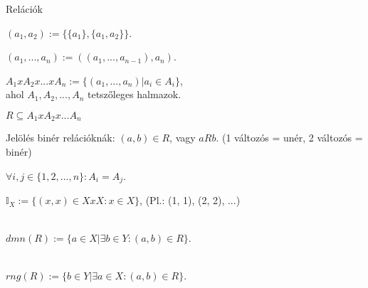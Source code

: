 \begin{frame}[plain]
\begin{tcolorbox}[center, colback={myyellow}, coltext={black}, colframe={myyellow}]
    {\RHuge Relációk}
    \mmedskip
\end{tcolorbox}
\end{frame}

\begin{frame}
  \begin{tcolorbox}[title={Def.: Rendezett pár}]
    $(a_1, a_2) := \{ \{ a_1 \}, \{ a_1, a_2 \} \}$.
  \end{tcolorbox}

  \begin{tcolorbox}[title={Def.: Rendezett $n$-es}]
    $(a_1, ..., a_n) := ((a_1, ..., a_{n - 1}), a_n)$.
  \end{tcolorbox}

  \begin{tcolorbox}[title={Def.: Descartes (Direkt) szorzat}]
    $A_1 x A_2 x ... x A_n := \{ (a_1, ..., a_n) | a_i \in A_i \}$,\\
    ahol $A_1, A_2, ..., A_n$ tetszőleges halmazok.
  \end{tcolorbox}

  \begin{tcolorbox}[title={Def.: $n$ változós reláció}]
    $R \subseteq A_1 x A_2 x ... A_n$\\
    \mmedskip

    Jelölés binér relációknák: $(a, b) \in R$, vagy $a R b$.
    (1 változós = unér, 2 változós = binér)
  \end{tcolorbox}

  \begin{tcolorbox}[title={Def.: Homogén reláció}]
    ${\forall}i, j \in \{ 1, 2, ..., n \} : A_i = A_j$.
  \end{tcolorbox}

  \begin{tcolorbox}[title={Def.: Identikus leképzés}]
    $\mathbb{I}_X := \{(x, x) \in X x X : x \in X \}$, (Pl.: (1, 1), (2, 2), ...)
  \end{tcolorbox}

  \begin{tcolorbox}[title={Def.: Reláció értelmezési tartománya}]
    \\
    $dmn(R) := \{ a \in X | {\exists}b \in Y : (a, b) \in R \}$.
  \end{tcolorbox}

  \begin{tcolorbox}[title={Def.: Reláció értékkészlete}]
    \\
    $rng(R) := \{ b \in Y | {\exists} a \in X : (a, b) \in R \}$.
  \end{tcolorbox}
\end{frame}


